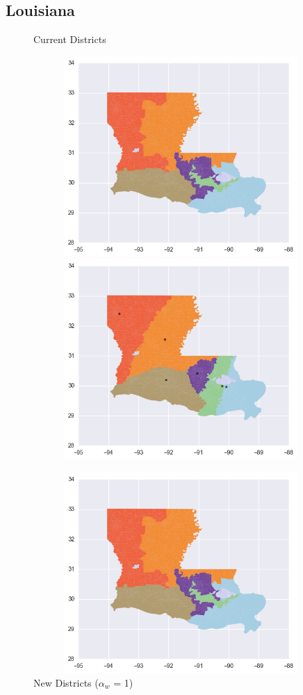 \clearpage
\newpage

\subsection{Louisiana}
\begin{figure}[htb!] \centering
\caption{ Current Districts }
\includegraphics[width=5in,height=3in,keepaspectratio]{../maps/LA/static/before.png}
\includegraphics[width=5in,height=3in,keepaspectratio]{../maps/LA/static/0_0_after.png}
\caption{ New Districts ($\alpha_w$ = 1) }
\includegraphics[width=5in,height=3in,keepaspectratio]{../maps/LA/static/before.png}

\end{figure}
